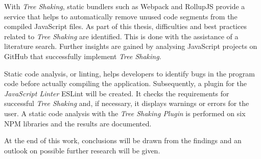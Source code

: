 With \textit{Tree Shaking}, static bundlers such as Webpack and RollupJS provide a service that helps to automatically remove unused code segments from the compiled JavaScript files. As part of this thesis, difficulties and best practices related to \textit{Tree Shaking} are identified. This is done with the assistance of a literature search. Further insights are gained by analysing JavaScript projects on GitHub that successfully implement \textit{Tree Shaking}.

Static code analysis, or linting, helps developers to identify bugs in the program code before actually compiling the application. Subsequently, a plugin for the \textit{JavaScript Linter} ESLint will be created. It checks the requirements for successful \textit{Tree Shaking} and, if necessary, it displays warnings or errors for the user. A static code analysis with the \textit{Tree Shaking Plugin} is performed on six NPM libraries and the results are documented.

At the end of this work, conclusions will be drawn from the findings and an outlook on possible further research will be given.